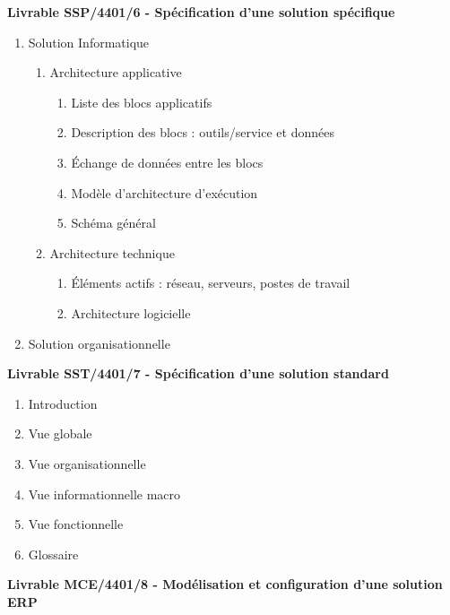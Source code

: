 \bf{Livrable SSP/4401/6 - Spécification d’une solution spécifique} \\

\begin{enumerate}
    \item Solution Informatique
        \begin{enumerate}
            \item Architecture applicative
                \begin{enumerate}
                    \item Liste des blocs applicatifs
                    \item Description des blocs : outils/service et données
                    \item Échange de données entre les blocs
                    \item Modèle d’architecture d’exécution
                    \item Schéma général
                \end{enumerate}
            \item Architecture technique
                \begin{enumerate}
                    \item Éléments actifs : réseau, serveurs, postes de travail
                    \item Architecture logicielle
                \end{enumerate}
        \end{enumerate}
    \item Solution organisationnelle \\
\end{enumerate}

\bf{Livrable SST/4401/7 - Spécification d’une solution standard} \\

\begin{enumerate}
    \item Introduction
    \item Vue globale 
    \item Vue organisationnelle 
    \item Vue informationnelle macro 
    \item Vue fonctionnelle
    \item Glossaire \\
\end{enumerate}

\bf{Livrable MCE/4401/8 - Modélisation et configuration d’une solution ERP} \\


